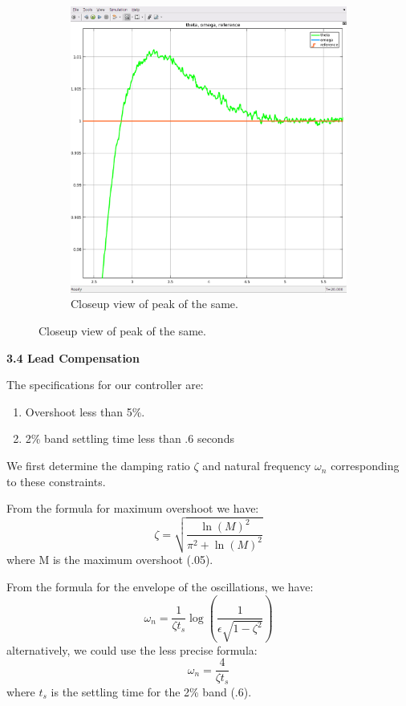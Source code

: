 \documentclass[11pt,a4paper]{article}
\begin{document}
\begin{figure}[!htbp]
\begin{subfigure}{.5\textwidth}
		\includegraphics[width = \textwidth]{imglab/lab4sol_constanttrajclose.png}
		\caption{Closeup view of peak of the same.}	
	\end{subfigure}
\end{figure}



\textbf{3.4 Lead Compensation}

The specifications for our controller are:
\begin{enumerate}
\item Overshoot less than 5\%.
\item 2\% band settling time less than .6 seconds
\end{enumerate}

We first determine the damping ratio $\zeta$ and natural frequency $\omega_{n}$ corresponding to these constraints.

From the formula for maximum overshoot we have:
\begin{equation}
	\zeta = \sqrt{\frac{\ln (M)^{2}}{\pi^{2} + \ln (M)^{2}}}
\end{equation}
where M is the maximum overshoot (.05).

From the formula for the envelope of the oscillations, we have:
\begin{equation}
	\omega_{n} = \frac{1}{\zeta t_{s}} \log \left( \frac{1}{\epsilon \sqrt{1 - \zeta^{2}}} \right)
\end{equation}
alternatively, we could use the less precise formula:
\begin{equation}
	\omega_{n} = \frac{4}{\zeta t_{s}}
\end{equation}
where $t_{s}$ is the settling time for the 2\% band (.6).
\end{document}
